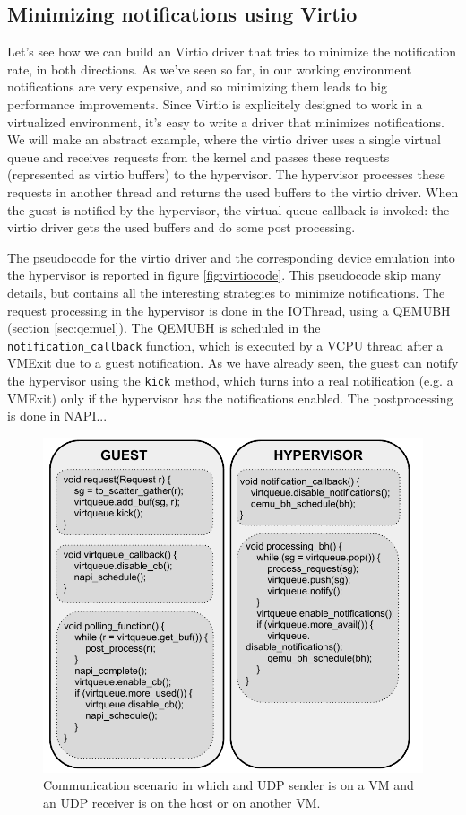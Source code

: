 

\subsection{Minimizing notifications using Virtio}
Let's see how we can build an Virtio driver that tries to minimize the notification rate, in both directions.
As we've seen so far, in our working environment notifications are very expensive, and so minimizing them leads to big performance
improvements. Since Virtio is explicitely designed to work in a virtualized environment, it's easy to write a driver that minimizes
notifications.
We will make an abstract example, where the virtio driver uses a single virtual queue and receives requests from the kernel and passes
these requests (represented as virtio buffers) to the hypervisor. The hypervisor processes these requests in another thread and returns 
the used buffers to the virtio driver. When the guest is notified by the hypervisor, the virtual queue callback is invoked: the virtio 
driver gets the used buffers and do some post processing.

\vspace{0.5cm}

The pseudocode for the virtio driver and the corresponding device emulation into the hypervisor is reported in figure
\ref{fig:virtiocode}. This pseudocode skip many details, but contains all the interesting strategies to minimize notifications.
The request processing in the hypervisor is done in the IOThread, using a QEMUBH (section \ref{sec:qemuel}). The QEMUBH is scheduled
in the \texttt{notification\_callback} function, which is executed by a VCPU thread after a VMExit due to a guest notification.
As we have already seen, the guest can notify the hypervisor using the \texttt{kick} method, which turns into a real notification
(e.g. a VMExit) only if the hypervisor has the notifications enabled.
The postprocessing is done in NAPI...


\begin{figure}[bt]
\centering
\includegraphics[scale = 1.0]{virtiocode.pdf}
\caption{Communication scenario in which and UDP sender is on a VM and an UDP receiver is on the host or on another VM.}
\label{fig:code}
\end{figure}


